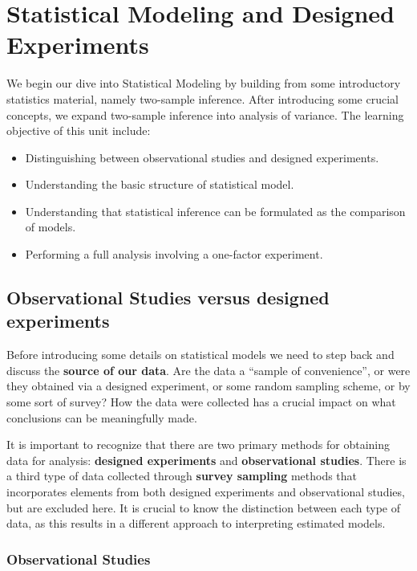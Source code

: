 \documentclass[
]{book}
\providecommand{\tightlist}{%
  \setlength{\itemsep}{0pt}\setlength{\parskip}{0pt}}
\begin{document}
\hypertarget{statistical-modeling-and-designed-experiments}{%
\chapter{Statistical Modeling and Designed Experiments}\label{statistical-modeling-and-designed-experiments}}

We begin our dive into Statistical Modeling by building from some introductory statistics material, namely two-sample inference.
After introducing some crucial concepts, we expand two-sample inference into analysis of variance.
The learning objective of this unit include:

\begin{itemize}
\tightlist
\item
  Distinguishing between observational studies and designed experiments.
\item
  Understanding the basic structure of statistical model.
\item
  Understanding that statistical inference can be formulated as the comparison of models.
\item
  Performing a full analysis involving a one-factor experiment.
\end{itemize}

\hypertarget{dataSources}{%
\section{Observational Studies versus designed experiments}\label{dataSources}}

Before introducing some details on statistical models we need to step back and discuss the \textbf{source of our data}.
Are the data a ``sample of convenience'', or were they obtained via a designed experiment, or some random sampling scheme, or by some sort of survey?
How the data were collected has a crucial impact on what conclusions can be meaningfully made.

It is important to recognize that there are two primary methods for obtaining data for analysis: \textbf{designed experiments} and \textbf{observational studies}.
There is a third type of data collected through \textbf{survey sampling} methods that incorporates elements from both designed experiments and observational studies, but are excluded here.
It is crucial to know the distinction between each type of data, as this results in a different approach to interpreting estimated models.

\hypertarget{observational-studies}{%
\subsection{Observational Studies}\label{observational-studies}}
\end{document}
